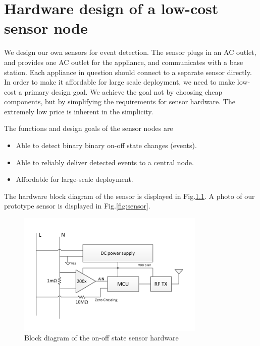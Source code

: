 \chapter{Hardware design of a low-cost sensor node}\label{chap3}

We design our own sensors for event detection. The sensor plugs in an AC outlet, and provides one AC outlet for the appliance, and communicates with a base station. Each appliance in question should connect to a separate sensor directly. In order to make it affordable for large scale deployment, we need to make low-cost a primary design goal. We achieve the goal not by choosing cheap components, but by simplifying the requirements for sensor hardware. The extremely low price is inherent in the simplicity. 


The functions and design goals of the sensor nodes are
\begin{itemize}
  \item Able to detect binary binary on-off state changes (events).
  \item Able to reliably deliver detected events to a central node.
  \item Affordable for large-scale deployment.
\end{itemize}

The hardware block diagram of the sensor is displayed in Fig.\ref{fig:hwoverview}. A photo of our prototype sensor is displayed in Fig.\ref{fig:sensor}.

\begin{figure}[htb]
  \centering
  \includegraphics[width=0.8\textwidth]{figures/hwoverview}
  \caption{Block diagram of the on-off state sensor hardware}
  \label{fig:hwoverview}
\end{figure}


